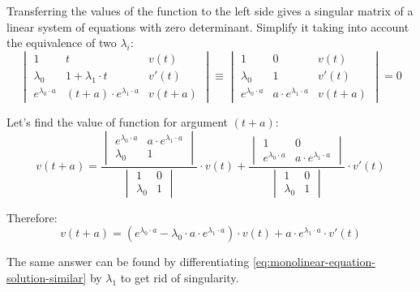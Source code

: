 \documentclass[a4paper, 11pt, oneside]{book}
\begin{document}
Transferring the values of the function to the left side gives a singular matrix of a linear system of equations with zero determinant. Simplify it taking into account the equivalence of two $\lambda_i$:
\begin{equation}\label{eq:monolinear-equation-2order-rep-roots-2}
  \begin{vmatrix}
    1 & t & v(t) \\
    \lambda_0 & 1 + \lambda_1 \cdot t & v'(t) \\
    e^{\lambda_0 \cdot a} & (t + a) \cdot e^{\lambda_1 \cdot a} & v(t + a)
  \end{vmatrix}
  \equiv
  \begin{vmatrix}
    1 & 0 & v(t) \\
    \lambda_0 & 1 & v'(t) \\
    e^{\lambda_0 \cdot a} & a \cdot e^{\lambda_1 \cdot a} & v(t + a)
  \end{vmatrix}
  =0
\end{equation}

Let's find the value of function for argument $(t + a)$:
\begin{equation}\label{eq:monolinear-equation-2order-rep-roots-3}
  v(t + a) = \frac{
  \begin{vmatrix}
    e^{\lambda_0 \cdot a} & a \cdot e^{\lambda_1 \cdot a} \\
    \lambda_0 & 1
  \end{vmatrix}
  }{
  \begin{vmatrix}
    1 & 0 \\
    \lambda_0 & 1
  \end{vmatrix}
  }
  \cdot v(t) + \frac{
  \begin{vmatrix}
    1 & 0 \\
    e^{\lambda_0 \cdot a} & a \cdot e^{\lambda_1 \cdot a}
  \end{vmatrix}
  }{
  \begin{vmatrix}
    1 & 0 \\
    \lambda_0 & 1
  \end{vmatrix}
  }
  \cdot v'(t)
\end{equation}

Therefore:
\begin{equation}\label{eq:monolinear-equation-2order-rep-roots-4}
  v(t + a) = (e^{\lambda_0 \cdot a} - \lambda_0 \cdot a \cdot e^{\lambda_1 \cdot a}) \cdot v(t) + a \cdot e^{\lambda_1 \cdot a} \cdot v'(t)
\end{equation}

The same answer can be found by differentiating \ref{eq:monolinear-equation-solution-similar} by $\lambda_1$ to get rid of singularity.
\end{document}
